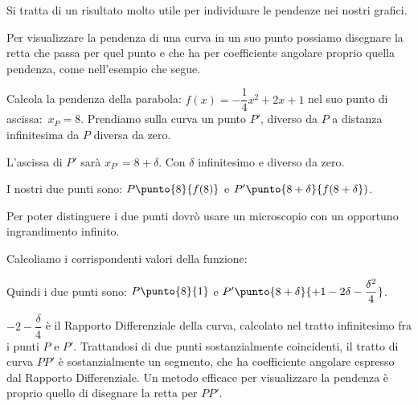 Si tratta di un risultato molto utile per individuare le pendenze nei 
nostri grafici. 

Per visualizzare la pendenza di una curva in un suo punto 
possiamo disegnare la retta che passa per quel punto e che ha per coefficiente 
angolare proprio quella pendenza, come nell'esempio che segue.

\begin{esempio}
Calcola la pendenza della parabola:
\(f(x) = -\dfrac{1}{4}x^2+2x +1\) \quad nel suo punto di ascissa:~\(x_P=8\).
Prendiamo sulla curva un punto \(P'\), diverso da \(P\) a 
distanza infinitesima da \(P\) diversa da zero.

L'ascissa di \(P'\) sarà \(x_{P'}=8+\delta\). 
Con \(\delta\) infinitesimo e diverso da zero.

I nostri due punti sono:
\(P\punto{8}{f(8)}\) e \(P'\punto{8+\delta}{f(8+\delta})\).

Per poter distinguere i due punti dovrò usare un microscopio con un 
opportuno ingrandimento infinito.

Calcoliamo i corrispondenti valori della funzione:


Quindi i due punti sono:
\(P\punto{8}{1}\) e 
\(P'\punto{8+\delta}{+1 - 2\delta -\dfrac{\delta^2}{4}}\).

\(-2-\dfrac{\delta}{4}\) è il Rapporto Differenziale della curva, calcolato nel 
tratto infinitesimo fra i punti \(P\) e \(P'\). Trattandosi di due punti 
sostanzialmente coincidenti, il tratto di curva \(PP'\) è sostanzialmente un 
segmento, che ha coefficiente angolare espresso dal Rapporto Differenziale. Un 
metodo efficace per visualizzare la pendenza è proprio quello di disegnare la 
retta per \(PP'\). 


\end{esempio}

